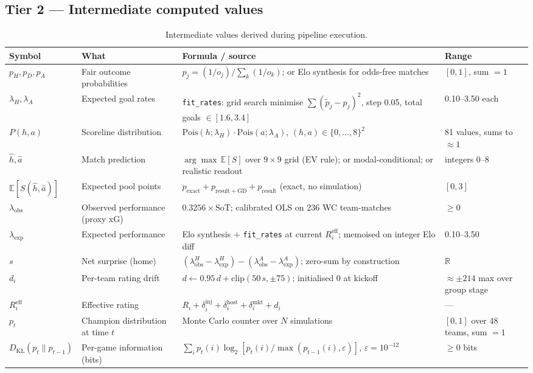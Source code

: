 \documentclass[11pt,letterpaper]{article}
\begin{document}
\subsection*{Tier 2 --- Intermediate computed values}

\begin{table}[H]
\centering
\caption{Intermediate values derived during pipeline execution.}
\label{tab:tier2}
\small
\begin{tabular}{p{2.6cm}p{3.2cm}p{5cm}p{2.4cm}}
\toprule
Symbol & What & Formula / source & Range \\
\midrule
$p_H, p_D, p_A$ &
  Fair outcome probabilities &
  $p_j = (1/o_j)/\sum_k(1/o_k)$; or Elo synthesis for odds-free matches &
  $[0,1]$, sum $=1$ \\[4pt]
$\lambda_H, \lambda_A$ &
  Expected goal rates &
  \texttt{fit\_rates}: grid search minimise $\sum(\tilde p_j-p_j)^2$,
  step 0.05, total goals $\in[1.6,3.4]$ &
  0.10--3.50 each \\[4pt]
$P(h,a)$ &
  Scoreline distribution &
  $\mathrm{Pois}(h;\lambda_H)\cdot\mathrm{Pois}(a;\lambda_A)$,
  $(h,a)\in\{0,\ldots,8\}^2$ &
  81 values, sums to $\approx1$ \\[4pt]
$\hat h, \hat a$ &
  Match prediction &
  $\arg\max\,\mathbb{E}[S]$ over $9\times9$ grid (EV rule);
  or modal-conditional; or realistic readout &
  integers 0--8 \\[4pt]
$\mathbb{E}[S(\hat h,\hat a)]$ &
  Expected pool points &
  $p_{\mathrm{exact}}+p_{\mathrm{result+GD}}+p_{\mathrm{result}}$
  (exact, no simulation) &
  $[0,3]$ \\[4pt]
$\lambda_{\mathrm{obs}}$ &
  Observed performance (proxy xG) &
  $0.3256\times\mathrm{SoT}$; calibrated OLS on 236 WC team-matches &
  $\ge0$ \\[4pt]
$\lambda_{\mathrm{exp}}$ &
  Expected performance &
  Elo synthesis $+$ \texttt{fit\_rates} at current $R_i^{\mathrm{eff}}$;
  memoised on integer Elo diff &
  0.10--3.50 \\[4pt]
$s$ &
  Net surprise (home) &
  $(\lambda_{\mathrm{obs}}^H - \lambda_{\mathrm{exp}}^H)
   -(\lambda_{\mathrm{obs}}^A - \lambda_{\mathrm{exp}}^A)$;
  zero-sum by construction &
  $\mathbb{R}$ \\[4pt]
$d_i$ &
  Per-team rating drift &
  $d \leftarrow 0.95\,d + \mathrm{clip}(50\,s,\pm75)$;
  initialised 0 at kickoff &
  $\approx\pm214$ max over group stage \\[4pt]
$R_i^{\mathrm{eff}}$ &
  Effective rating &
  $R_i+\delta_i^{\mathrm{inj}}+\delta_i^{\mathrm{host}}
   +\delta_i^{\mathrm{mkt}}+d_i$ &
  --- \\[4pt]
$p_t$ &
  Champion distribution at time $t$ &
  Monte Carlo counter over $N$ simulations &
  $[0,1]$ over 48 teams, sum $=1$ \\[4pt]
$D_{\mathrm{KL}}(p_t\|p_{t-1})$ &
  Per-game information (bits) &
  $\sum_i p_t(i)\log_2[p_t(i)/\max(p_{t-1}(i),\varepsilon)]$,
  $\varepsilon=10^{-12}$ &
  $\ge0$ bits \\
\bottomrule
\end{tabular}
\end{table}
\end{document}

